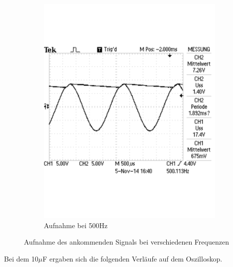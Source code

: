 \documentclass[12pt,a4paper]{article}
\begin{document}
\begin{figure}[H]
\begin{subfigure}[b]{0.48\textwidth}
                \includegraphics[width=\textwidth , scale = 0.4]{2_2_1F_2.pdf}
                \caption[Aufnahme bei 500Hz]{Aufnahme bei 500Hz}
  				\label{fig:2_2_1F_2}
        \end{subfigure}
        \caption{Aufnahme des ankommenden Signals bei verschiedenen Frequenzen}
        \label{fig:2_2_1F}
\end{figure}

Bei dem 10$\mu$F ergaben sich die folgenden Verläufe auf dem Oszilloskop.
\end{document}

